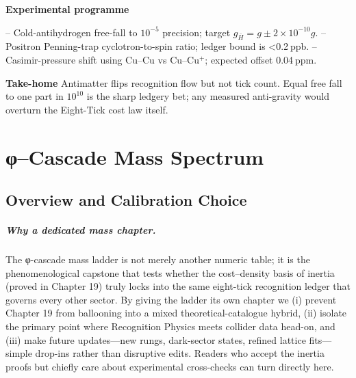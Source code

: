 \documentclass[11pt,oneside]{book}
\begin{document}
\textbf{Experimental programme}  

– Cold-antihydrogen free-fall to \(10^{-5}\) precision; target \(g_{\bar H}=g\pm2\times10^{-10}g\).  
– Positron Penning-trap cyclotron-to-spin ratio; ledger bound is <0.2 ppb.  
– Casimir-pressure shift using Cu–Cu vs Cu–Cu\(^+\); expected offset 0.04 ppm.

\textbf{Take-home}  
Antimatter flips recognition flow but not tick count.  Equal free fall to one part in \(10^{10}\) is the sharp ledgery bet; any measured anti-gravity would overturn the Eight-Tick cost law itself.









\chapter{φ–Cascade Mass Spectrum}
\label{chap:phi-cascade}

\section{Overview and Calibration Choice}
\label{sec:phi-overview}

\paragraph*{Why a dedicated mass chapter.}
The φ-cascade mass ladder is not merely another numeric table; it is the phenomenological
capstone that tests whether the cost–density basis of inertia (proved in Chapter 19)
truly locks into the same eight-tick recognition ledger that governs every other
sector.  By giving the ladder its own chapter we
(i) prevent Chapter 19 from ballooning into a mixed theoretical-catalogue hybrid,
(ii) isolate the primary point where Recognition Physics meets collider data head-on,
and (iii) make future updates—new rungs, dark-sector states, refined lattice
fits—simple drop-ins rather than disruptive edits.  Readers who accept the inertia
proofs but chiefly care about experimental cross-checks can turn directly here.
\end{document}
